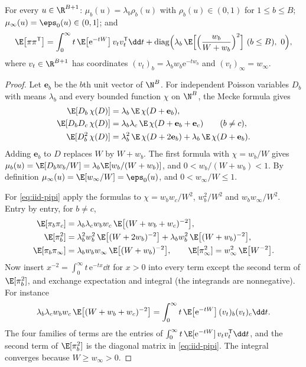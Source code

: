 \begin{lemma}\label{lem:iid-mecke}
For every $u\in\R^{B+1}$: $\mu_b(u)=\lambda_b\rho_b(u)$ with $\rho_b(u)\in(0,1)$ for
$1\le b\le B$; $\mu_\infty(u)=\eps_0(u)\in(0,1]$; and
\begin{equation}\label{eq:iid-pipi}
\E\bigl[\pi\pi^{\mathsf T}\bigr]=\int_0^\infty t\,\E\bigl[\mathrm{e}^{-tW}\bigr]\,
v_tv_t^{\mathsf T}\dd t+\operatorname{diag}\Bigl(\lambda_b\,
\E\Bigl[\Bigl(\frac{w_b}{W+w_b}\Bigr)^2\Bigr]\ (b\le B),\ 0\Bigr),
\end{equation}
where $v_t\in\R^{B+1}$ has coordinates $(v_t)_b=\lambda_bw_b\mathrm{e}^{-tw_b}$ and
$(v_t)_\infty=w_\infty$.
\end{lemma}

\begin{proof}
Let $\mathbf{e}_b$ be the $b$th unit vector of $\N^B$. For independent Poisson variables
$D_b$ with means $\lambda_b$ and every bounded function $\chi$ on $\N^B$, the Mecke formula
gives
\begin{align*}
\E[D_b\,\chi(D)]&=\lambda_b\,\E\,\chi(D+\mathbf{e}_b),\\
\E[D_bD_c\,\chi(D)]&=\lambda_b\lambda_c\,\E\,\chi(D+\mathbf{e}_b+\mathbf{e}_c)\qquad(b\ne c),\\
\E[D_b^2\,\chi(D)]&=\lambda_b^2\,\E\,\chi(D+2\mathbf{e}_b)+\lambda_b\,\E\,\chi(D+\mathbf{e}_b).
\end{align*}
Adding $\mathbf{e}_b$ to $D$ replaces $W$ by $W+w_b$. The first formula with
$\chi=w_b/W$ gives $\mu_b(u)=\E[D_bw_b/W]=\lambda_b\E[w_b/(W+w_b)]$, and
$0<w_b/(W+w_b)<1$. By definition $\mu_\infty(u)=\E[w_\infty/W]=\eps_0(u)$, and
$0<w_\infty/W\le1$.

For \eqref{eq:iid-pipi} apply the formulas to $\chi=w_bw_c/W^2$, $w_b^2/W^2$ and
$w_bw_\infty/W^2$. Entry by entry, for $b\ne c$,
\begin{align*}
\E[\pi_b\pi_c]&=\lambda_b\lambda_cw_bw_c\,\E\bigl[(W+w_b+w_c)^{-2}\bigr],\\
\E[\pi_b^2]&=\lambda_b^2w_b^2\,\E\bigl[(W+2w_b)^{-2}\bigr]
 +\lambda_bw_b^2\,\E\bigl[(W+w_b)^{-2}\bigr],\\
\E[\pi_b\pi_\infty]&=\lambda_bw_bw_\infty\,\E\bigl[(W+w_b)^{-2}\bigr],\qquad
\E[\pi_\infty^2]=w_\infty^2\,\E\bigl[W^{-2}\bigr].
\end{align*}
Now insert $x^{-2}=\int_0^\infty t\,\mathrm{e}^{-tx}\dd t$ for $x>0$ into every term
except the second term of $\E[\pi_b^2]$, and exchange expectation and integral (the
integrands are nonnegative). For instance
\[
\lambda_b\lambda_cw_bw_c\,\E\bigl[(W+w_b+w_c)^{-2}\bigr]
=\int_0^\infty t\,\E\bigl[\mathrm{e}^{-tW}\bigr]\,(v_t)_b(v_t)_c\dd t .
\]
The four families of terms
are the entries of $\int_0^\infty t\,\E[\mathrm{e}^{-tW}]\,v_tv_t^{\mathsf T}\dd t$, and
the second term of $\E[\pi_b^2]$ is the diagonal matrix in \eqref{eq:iid-pipi}. The
integral converges because $W\ge w_\infty>0$.
\end{proof}

